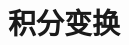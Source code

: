 \documentclass[12pt,handout]{ctexbeamer}
\begin{document}
\setcounter{part}{5}
\part{积分变换}




\end{document}

